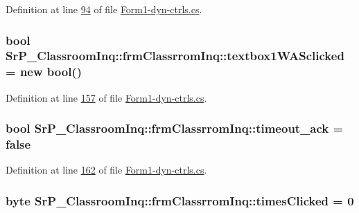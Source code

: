 \-Definition at line \hyperlink{_form1-dyn-ctrls_8cs_source_l00094}{94} of file \hyperlink{_form1-dyn-ctrls_8cs_source}{\-Form1-\/dyn-\/ctrls.\-cs}.

\hypertarget{class_sr_p___classroom_inq_1_1frm_classrrom_inq_a998e499144884577e3445f4b721b4c6a}{
\subsubsection[{textbox1\-W\-A\-Sclicked}]{\setlength{\rightskip}{0pt plus 5cm}bool {\bf \-Sr\-P\-\_\-\-Classroom\-Inq\-::frm\-Classrrom\-Inq\-::textbox1\-W\-A\-Sclicked} = new bool()}}
\label{class_sr_p___classroom_inq_1_1frm_classrrom_inq_a998e499144884577e3445f4b721b4c6a}


\-Definition at line \hyperlink{_form1-dyn-ctrls_8cs_source_l00157}{157} of file \hyperlink{_form1-dyn-ctrls_8cs_source}{\-Form1-\/dyn-\/ctrls.\-cs}.

\hypertarget{class_sr_p___classroom_inq_1_1frm_classrrom_inq_a64cde7d8ac96b5122de783724c58103a}{
\subsubsection[{timeout\-\_\-ack}]{\setlength{\rightskip}{0pt plus 5cm}bool {\bf \-Sr\-P\-\_\-\-Classroom\-Inq\-::frm\-Classrrom\-Inq\-::timeout\-\_\-ack} = false}}
\label{class_sr_p___classroom_inq_1_1frm_classrrom_inq_a64cde7d8ac96b5122de783724c58103a}


\-Definition at line \hyperlink{_form1-dyn-ctrls_8cs_source_l00162}{162} of file \hyperlink{_form1-dyn-ctrls_8cs_source}{\-Form1-\/dyn-\/ctrls.\-cs}.

\hypertarget{class_sr_p___classroom_inq_1_1frm_classrrom_inq_a8b01f872cc35c75e41502f5114a65b74}{
\subsubsection[{times\-Clicked}]{\setlength{\rightskip}{0pt plus 5cm}byte {\bf \-Sr\-P\-\_\-\-Classroom\-Inq\-::frm\-Classrrom\-Inq\-::times\-Clicked} = 0}}
\label{class_sr_p___classroom_inq_1_1frm_classrrom_inq_a8b01f872cc35c75e41502f5114a65b74}


